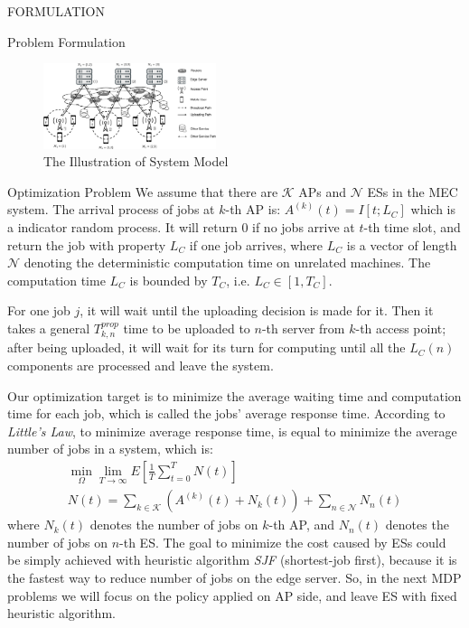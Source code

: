 \documentclass[10pt, conference, letterpaper]{IEEEtran}
\begin{document}
\begin{section}{FORMULATION}
\begin{subsection}{Problem Formulation}
            \begin{figure}[h]
                \centering
                \includegraphics[width=0.45\textwidth, trim={0.5cm 0.5cm 0.5cm 0.5cm}, clip]{system-model.pdf}
                \caption{The Illustration of System Model}
                \label{fig:system}
            \end{figure}

            \begin{subsubsection}{Optimization Problem}
                We assume that there are $\mathcal{K}$ APs and $\mathcal{N}$ ESs in the MEC system.
                The arrival process of jobs at $k$-th AP is: $A^{(k)}(t)=I[t; L_C]$ which is a indicator random process. It will return $0$ if no jobs arrive at $t$-th time slot, and return the job with property $L_C$ if one job arrives, where $L_C$ is a vector of length $\mathcal{N}$ denoting the deterministic computation time on unrelated machines.
                The computation time $L_C$ is bounded by $T_C$, i.e. $L_C \in [1,T_C]$.
                
                For one job $j$, it will wait until the uploading decision is made for it. Then it takes a general $T^{prop}_{k,n}$ time to be uploaded to $n$-th server from $k$-th access point; after being uploaded, it will wait for its turn for computing until all the $L_C(n)$ components are processed and leave the system.
                
                Our optimization target is to minimize the average waiting time and computation time for each job, which is called the jobs' average response time. According to \emph{Little’s Law}, to minimize average response time, is equal to minimize the average number of jobs in a system, which is:
                \begin{gather}
                    \min_{\Omega} \lim_{T \to \infty} E[\frac{1}{T} \sum_{t=0}^{T} N(t)]
                    \\
                    N(t) = \sum_{k \in \mathcal{K}} (A^{(k)}(t) + N_k(t))
                            + \sum_{n \in \mathcal{N}} N_n(t)
                \end{gather}
                where $N_k(t)$ denotes the number of jobs on $k$-th AP, and $N_n(t)$ denotes the number of jobs on $n$-th ES.
                The goal to minimize the cost caused by ESs could be simply achieved with heuristic algorithm \emph{SJF} (shortest-job first), because it is the fastest way to reduce number of jobs on the edge server. So, in the next MDP problems we will focus on the policy applied on AP side, and leave ES with fixed heuristic algorithm.
            \end{subsubsection}


\end{subsection}
\end{section}
\end{document}
